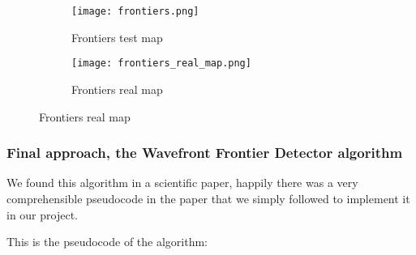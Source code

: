 \begin{figure}[h]
    \centering
    \begin{subfigure}{.5\textwidth}
        \centering
        \texttt{[image: frontiers.png]}
        \caption{Frontiers test map}
        \label{fig:frontiers}
    \end{subfigure}%
    \begin{subfigure}{.5\textwidth}
        \centering
        \texttt{[image: frontiers\_real\_map.png]}
        \caption{Frontiers real map}
        \label{fig:frontiers_real_map}
    \end{subfigure}
\end{figure}

\subsubsection{Final approach, the Wavefront Frontier Detector algorithm}

We found this algorithm in a scientific paper\cite{wavefront}, happily there was a very comprehensible pseudocode in the paper that we simply followed to implement it in our project.

This is the pseudocode of the algorithm:

